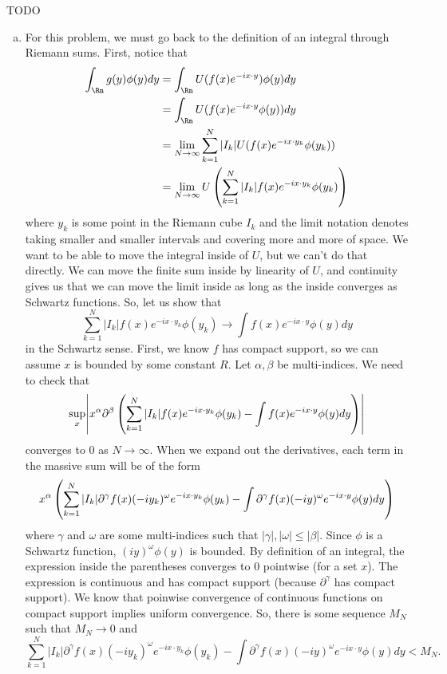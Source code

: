 \documentclass{article}
\renewcommand{\d}{\partial}
\begin{document}
\newpage
{} TODO
 \tri
\hop 
\solution
\begin{enumerate}[(a)]
    \item For this problem, we must go back to the definition of an integral through Riemann sums. First, notice that 
    \begin{align*}
        \int_\Rn g(y)\phi(y)dy &= \int_\Rn U(f(x)e^{-i x \cdot y})\phi(y) dy \\
        &= \int_\Rn U(f(x)e^{-i x \cdot y}\phi(y)) dy \\
        &= \lim_{N \to \infty} \sum^N_{k=1} |I_k| U(f(x)e^{-i x \cdot y_k}\phi(y_k))\\
        &= \lim_{N \to \infty}  U\del{\sum^N_{k=1} |I_k| f(x)e^{-i x \cdot y_k}\phi(y_k)}
    \end{align*}
    where $y_k$ is some point in the Riemann cube $I_k$ and the limit notation denotes taking smaller and smaller intervals and covering more and more of space. 
    \hop 
    We want to be able to move the integral inside of $U$, but we can't do that directly. We can move the finite sum inside by linearity of $U$, and continuity gives us that we can move the limit inside as long as the inside converges as Schwartz functions. So, let us show that 
    \[\sum^N_{k=1} |I_k|f(x)e^{-i x \cdot y_k}\phi(y_k) \to \int f(x)e^{-ix \cdot y} \phi(y)dy\]
    in the Schwartz sense. First, we know $f$ has compact support, so we can assume $x$ is bounded by some constant $R$. Let $\alpha, \beta$ be multi-indices. We need to check that 
    \[\sup_x\abs{x^\alpha \d^\beta \del{\sum^N_{k=1} |I_k|f(x)e^{-i x \cdot y_k}\phi(y_k) - \int f(x)e^{-ix \cdot y} \phi(y)dy}}\]
    converges to 0 as $N \to \infty$. When we expand out the derivatives, each term in the massive sum will be of the form 
    \[x^\alpha  \del{\sum_{k=1}^N |I_k|\d^\gamma f(x)(-iy_k)^\omega e^{-ix \cdot y_k} \phi(y_k) - \int \d^\gamma f(x) (-iy)^\omega  e^{-ix \cdot y}\phi(y) dy}\]
    where $\gamma$ and $\omega$ are some multi-indices such that $|\gamma|, |\omega| \le |\beta|$. Since $\phi$ is a Schwartz function, $(iy)^\omega \phi(y)$ is bounded. By definition of an integral, the expression inside the parentheses converges to 0 pointwise (for a set $x$). The expression is continuous and has compact support (because $\d^\gamma$ has compact support). We know that poinwise convergence of continuous functions on compact support implies uniform convergence. So, there is some sequence $M_N$ such that $M_N \to 0$ and 
    \[\sum_{k=1}^N |I_k|\d^\gamma f(x)(-iy_k)^\omega e^{-ix \cdot y_k} \phi(y_k) - \int \d^\gamma f(x) (-iy)^\omega e^{-ix \cdot y}\phi(y) dy < M_N.\]

\end{enumerate}
\end{document}
